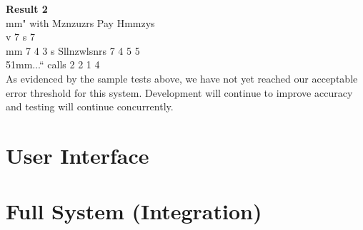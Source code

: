 \documentclass[a4paper,12pt]{article}
\begin{document}
		\textbf{Result 2}\\
		mm" with Mznzuzrs Pay Hmmzys\\
		 v 7 s 7\\
		mm 7 4 3 s
		Sllnzwlsnrs 7 4 5 5\\
		51mm...“ calls 2 2 1 4\\
		
		
		As evidenced by the sample tests above, we have not yet reached our acceptable error threshold for this system. Development will continue to improve accuracy and testing will continue concurrently.
\section{User Interface}

\section{Full System (Integration)}
\end{document}
